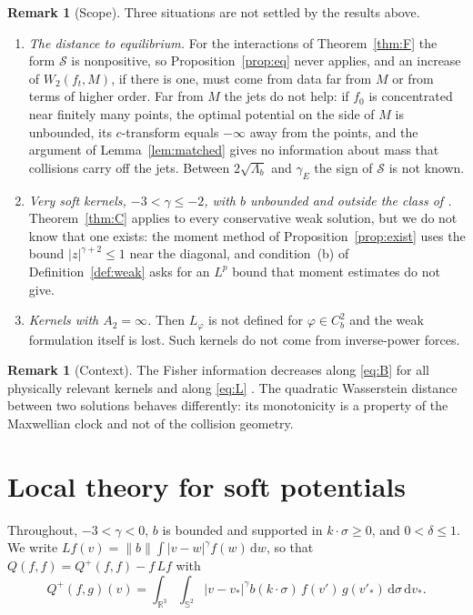 \documentclass[11pt]{amsart}
\theoremstyle{definition}
\newtheorem{remark}[theorem]{Remark}
\newcommand{\RR}{\mathbb{R}}
\newcommand{\Sph}{\mathbb{S}}
\newcommand{\dd}{\,\mathrm{d}}
\newcommand{\nb}{\|b\|}
\begin{document}
\begin{remark}[Scope]
Three situations are not settled by the results above.
\begin{enumerate}
\item[(a)] \emph{The distance to equilibrium.} For the interactions of Theorem~\ref{thm:F} the form $\mathcal S$ is nonpositive, so Proposition~\ref{prop:eq} never applies, and an increase of $W_2(f_t,M)$, if there is one, must come from data far from $M$ or from terms of higher order. Far from $M$ the jets do not help: if $f_0$ is concentrated near finitely many points, the optimal potential on the side of $M$ is unbounded, its $c$-transform equals $-\infty$ away from the points, and the argument of Lemma~\ref{lem:matched} gives no information about mass that collisions carry off the jets. Between $2\sqrt{\Lambda_b}$ and $\gamma_E$ the sign of $\mathcal S$ is not known.
\item[(b)] \emph{Very soft kernels, $-3<\gamma\le-2$, with $b$ unbounded and outside the class of \cite{ISV25}.} Theorem~\ref{thm:C} applies to every conservative weak solution, but we do not know that one exists: the moment method of Proposition~\ref{prop:exist} uses the bound $|z|^{\gamma+2}\le1$ near the diagonal, and condition~(b) of Definition~\ref{def:weak} asks for an $L^p$ bound that moment estimates do not give.
\item[(c)] \emph{Kernels with $A_2=\infty$.} Then $L_\varphi$ is not defined for $\varphi\in C^2_b$ and the weak formulation itself is lost. Such kernels do not come from inverse-power forces.
\end{enumerate}
\end{remark}

\begin{remark}[Context]
The Fisher information decreases along \eqref{eq:B} for all physically relevant kernels \cite{ISV25} and along \eqref{eq:L} \cite{GS25}. The quadratic Wasserstein distance between two solutions behaves differently: its monotonicity is a property of the Maxwellian clock and not of the collision geometry.
\end{remark}

\appendix

\section{Local theory for soft potentials}\label{app:soft}

Throughout, $-3<\gamma<0$, $b$ is bounded and supported in $k\cdot\sigma\ge0$, and $0<\delta\le1$. We write $Lf(v)=\nb\int|v-w|^\gamma f(w)\dd w$, so that $Q(f,f)=Q^+(f,f)-f\,Lf$ with
\[
Q^+(f,g)(v)=\int_{\RR^3}\int_{\Sph^2}|v-v_*|^\gamma b(k\cdot\sigma)\,f(v')\,g(v'_*)\dd\sigma\dd v_* .
\]
\end{document}

